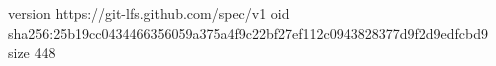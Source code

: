 version https://git-lfs.github.com/spec/v1
oid sha256:25b19cc0434466356059a375a4f9c22bf27ef112c0943828377d9f2d9edfcbd9
size 448
